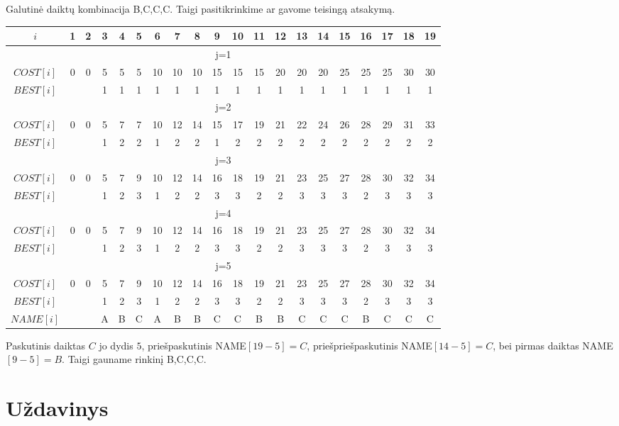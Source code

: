 \documentclass[a4paper,lithuanian]{article}
\begin{document}
Galutinė daiktų kombinacija B,C,C,C. Taigi pasitikrinkime ar gavome teisingą atsakymą.\\
\begin{center}
\begin{tabular}{ c c c c c c c c c c c c c c c c c c c c }
  \hline
  $i$        & 1 & 2 & 3 & 4 & 5 & 6  & 7  & 8  & 9  & 10 & 11 & 12 & 13 & 14 & 15 & 16 & 17 & 18 & 19\\
  \hline
  \multicolumn{20}{c}{j=1}\\
  \hline
  $COST[i]$ & 0 & 0 & 5 & 5 & 5 & 10 & 10 & 10 & 15 & 15 & 15 & 20 & 20 & 20 & 25 & 25 & 25 & 30 & 30\\
  $BEST[i]$  &   &   & 1 & 1 & 1 & 1  & 1  & 1  & 1  & 1  & 1  &  1 &  1 &  1 &  1 &  1 &  1 &  1 &  1\\
  \hline
  \multicolumn{20}{c}{j=2}\\
  \hline
  $COST[i]$ & 0 & 0 & 5 & 7 & 7 & 10 & 12 & 14 & 15 & 17 & 19 & 21 & 22 & 24 & 26 & 28 & 29 & 31 & 33\\
  $BEST[i]$ &   &   & 1 & 2 & 2 & 1 & 2 & 2 & 1 & 2 & 2 & 2 & 2 & 2 & 2 & 2 & 2 & 2 & 2\\
  \hline
  \multicolumn{20}{c}{j=3}\\
  \hline
  $COST[i]$ & 0 & 0 & 5 & 7 & 9 & 10 & 12 & 14 & 16 & 18 & 19 & 21 & 23 & 25 & 27 & 28 & 30 & 32 & 34\\
  $BEST[i]$ &   &   & 1 & 2 & 3 & 1 & 2 & 2 & 3 & 3 & 2 & 2 & 3 & 3 & 3 & 2 & 3 & 3 & 3\\
  \hline
  \multicolumn{20}{c}{j=4}\\
  \hline
  $COST[i]$ & 0 & 0 & 5 & 7 & 9 & 10 & 12 & 14 & 16 & 18 & 19 & 21 & 23 & 25 & 27 & 28 & 30 & 32 & 34\\
  $BEST[i]$ &   &   & 1 & 2 & 3 & 1 & 2 & 2 & 3 & 3 & 2 & 2 & 3 & 3 & 3 & 2 & 3 & 3 & 3\\
  \hline
  \multicolumn{20}{c}{j=5}\\
  \hline
  $COST[i]$ & 0 & 0 & 5 & 7 & 9 & 10 & 12 & 14 & 16 & 18 & 19 & 21 & 23 & 25 & 27 & 28 & 30 & 32 & 34\\
  $BEST[i]$ &   &   & 1 & 2 & 3 & 1 & 2 & 2 & 3 & 3 & 2 & 2 & 3 & 3 & 3 & 2 & 3 & 3 & 3\\
  $NAME[i]$ &   &   & A & B & C & A & B & B & C & C & B & B & C & C & C & B & C & C & C\\
  \hline
\end{tabular}
\end{center}

Paskutinis daiktas $C$ jo dydis $5$, priešpaskutinis NAME$[19 - 5] = C$, priešpriešpaskutinis NAME$[14 - 5] = C$, bei pirmas daiktas NAME$[9-5] = B$. Taigi gauname rinkinį B,C,C,C.

\section{Uždavinys}
\end{document}
